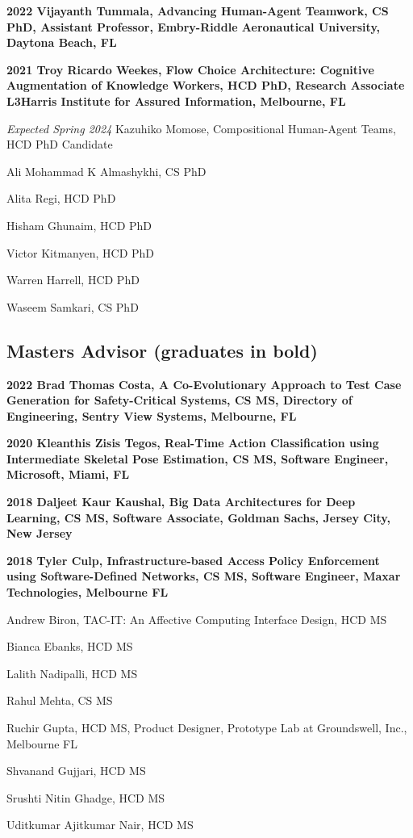 \documentclass[12pt,letterpaper]{report}
\newcommand{\listitemspace}{0.25em}
\renewenvironment{itemize}
{\begin{list}{}{\setlength{\leftmargin}{0em}
                \setlength{\parskip}{0em}
                \setlength{\itemsep}{\listitemspace}
                \setlength{\parsep}{\listitemspace}}}
{\end{list}}
\begin{document}
    \begin{itemize}
        \item \textbf{2022 Vijayanth Tummala, Advancing Human-Agent Teamwork, CS PhD, Assistant Professor, Embry-Riddle Aeronautical University, Daytona Beach, FL}
        \item \textbf{2021 Troy Ricardo Weekes, Flow Choice Architecture: Cognitive Augmentation of Knowledge Workers, HCD PhD, Research Associate L3Harris Institute for Assured Information, Melbourne, FL}
        \item \textit{Expected Spring 2024} Kazuhiko Momose, Compositional Human-Agent Teams, HCD PhD Candidate
        \item Ali Mohammad K Almashykhi, CS PhD
        \item Alita Regi, HCD PhD
        \item Hisham Ghunaim, HCD PhD
        \item Victor Kitmanyen, HCD PhD
        \item Warren Harrell, HCD PhD
        \item Waseem Samkari, CS PhD
    \end{itemize}

    \subsection*{Masters Advisor (graduates in bold)}

    \begin{itemize}
        \item \textbf{2022 Brad Thomas Costa, A Co-Evolutionary Approach to Test Case Generation for Safety-Critical Systems, CS MS, Directory of Engineering, Sentry View Systems, Melbourne, FL}
        \item \textbf{2020 Kleanthis Zisis Tegos, Real-Time Action Classification using Intermediate Skeletal Pose Estimation, CS MS, Software Engineer, Microsoft, Miami, FL}
        \item \textbf{2018 Daljeet Kaur Kaushal, Big Data Architectures for Deep Learning, CS MS, Software Associate, Goldman Sachs, Jersey City, New Jersey}
        \item \textbf{2018 Tyler Culp, Infrastructure-based Access Policy Enforcement using Software-Defined Networks, CS MS, Software Engineer, Maxar Technologies, Melbourne FL}
        \item Andrew Biron, TAC-IT: An Affective Computing Interface Design,  HCD MS
        \item Bianca Ebanks, HCD MS
        \item Lalith Nadipalli, HCD MS
        \item Rahul Mehta, CS MS
        \item Ruchir Gupta, HCD MS, Product Designer, Prototype Lab at Groundswell, Inc., Melbourne FL
        \item Shvanand Gujjari, HCD MS
        \item Srushti Nitin Ghadge, HCD MS
        \item Uditkumar Ajitkumar Nair, HCD MS
        

    \end{itemize}
\end{document}
